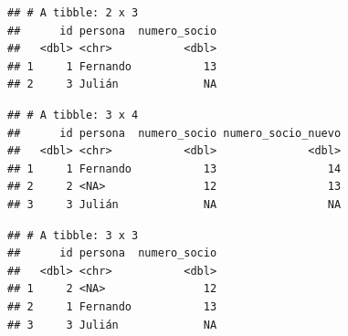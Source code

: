 \documentclass[]{book}
\newenvironment{Shaded}{\begin{snugshade}}{\end{snugshade}}
\newcommand{\KeywordTok}[1]{\textcolor[rgb]{0.13,0.29,0.53}{\textbf{#1}}}
\newcommand{\DataTypeTok}[1]{\textcolor[rgb]{0.13,0.29,0.53}{#1}}
\newcommand{\DecValTok}[1]{\textcolor[rgb]{0.00,0.00,0.81}{#1}}
\newcommand{\StringTok}[1]{\textcolor[rgb]{0.31,0.60,0.02}{#1}}
\newcommand{\CommentTok}[1]{\textcolor[rgb]{0.56,0.35,0.01}{\textit{#1}}}
\newcommand{\OperatorTok}[1]{\textcolor[rgb]{0.81,0.36,0.00}{\textbf{#1}}}
\newcommand{\NormalTok}[1]{#1}
\theoremstyle{definition}
\theoremstyle{definition}
\theoremstyle{definition}
\theoremstyle{remark}
\begin{document}
\begin{Shaded}
\end{Shaded}

\begin{verbatim}
## # A tibble: 2 x 3
##      id persona  numero_socio
##   <dbl> <chr>           <dbl>
## 1     1 Fernando           13
## 2     3 Julián             NA
\end{verbatim}

\begin{Shaded}
\end{Shaded}

\begin{verbatim}
## # A tibble: 3 x 4
##      id persona  numero_socio numero_socio_nuevo
##   <dbl> <chr>           <dbl>              <dbl>
## 1     1 Fernando           13                 14
## 2     2 <NA>               12                 13
## 3     3 Julián             NA                 NA
\end{verbatim}

\begin{Shaded}
\end{Shaded}

\begin{verbatim}
## # A tibble: 3 x 3
##      id persona  numero_socio
##   <dbl> <chr>           <dbl>
## 1     2 <NA>               12
## 2     1 Fernando           13
## 3     3 Julián             NA
\end{verbatim}

\begin{Shaded}
\end{Shaded}
\end{document}
